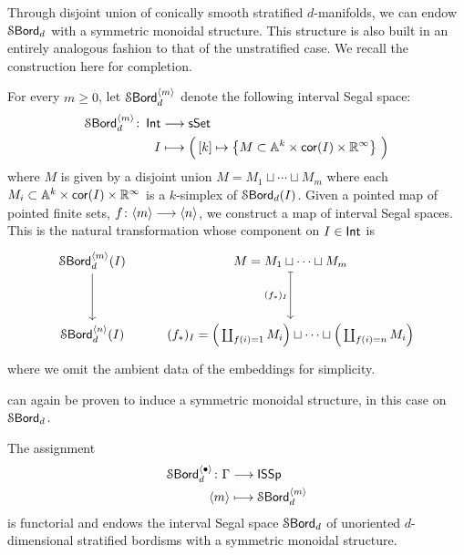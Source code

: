 Through disjoint union of conically smooth stratified $d$-manifolds, we can endow $\operatorname{\mathcal S\mathsf{Bord}}_d$ with a symmetric monoidal structure. This structure is also built in an entirely analogous fashion to that of the unstratified case. We recall the construction here for completion.

\begin{construction}\label{ch5:: cons: Gamma-space}
  For every $m\geq 0$, let $\operatorname{\mathcal S\mathsf{Bord}}_d^{\langle m \rangle}$ denote the following interval Segal space:
\begin{align}
    \operatorname{\mathcal S\mathsf{Bord}}_d^{\langle m \rangle} \colon \operatorname{\mathsf{Int}} &\longrightarrow \operatorname{\sf sSet} \\
    I &\longmapsto \Big(\,[k] \mapsto \left\{M \subset \mathbb A^{k}\times \mathsf{cor}(I)\times \mathbb R^{\operatorname{\infty}}\right\}\,\Big)
\end{align} 
where $M$ is given by a disjoint union $M = M_{1} \sqcup \cdots \sqcup M_{m}$ where each $M_{i}\subset \mathbb A^{k} \times \mathsf{cor}(I)\times \mathbb R^{\operatorname{\infty}}$ is a $k$-simplex of $\operatorname{\mathcal S\mathsf{Bord}}_d(I)$. Given a pointed map of pointed finite sets, $f\colon \langle m \rangle \longrightarrow \langle n \rangle$, we construct a map of interval Segal spaces. This is the natural transformation whose component on $I \in \operatorname{\mathsf{Int}}$ is
\begin{equation}
    \begin{tikzcd}
        {\bordstr_d^{\langle m \rangle }(I)} & {M = M_1 \sqcup \cdots \sqcup M_m} \\
        \\
        {\bordstr_d^{\langle n \rangle }(I)} & {(f_*)_I = \Big(\coprod_{f(i) = 1}M_i\Big) \sqcup \cdots \sqcup \Big(\coprod_{f(i) = n}M_i\Big)}
        \arrow[from=1-1, to=3-1]
        \arrow["{{(f_*)_I}}"', maps to, from=1-2, to=3-2]
    \end{tikzcd}
\end{equation}
where we omit the ambient data of the embeddings for simplicity.
\end{construction}

 can again be proven to induce a symmetric monoidal structure, in this case on $\operatorname{\mathcal S\mathsf{Bord}}_d$.

\begin{theorem}\label{ch5:: thm: symmetric monoidal stratified}
    The assignment 
    \begin{align}
        \operatorname{\mathcal S\mathsf{Bord}}_{d}^{\langle \bullet \rangle} \colon \Gamma &\longrightarrow \mathsf{ISSp} \\
        \langle m \rangle & \longmapsto \operatorname{\mathcal S\mathsf{Bord}}_d^{\langle m \rangle}
    \end{align}
    is functorial and endows the interval Segal space $\operatorname{\mathcal S\mathsf{Bord}}_d$ of unoriented $d$-dimensional stratified bordisms with a symmetric monoidal structure.
\end{theorem}


